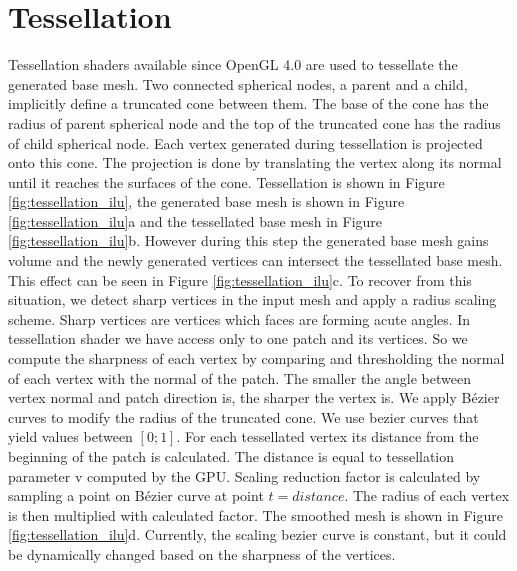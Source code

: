 \section{Tessellation}
Tessellation shaders available since OpenGL 4.0 are used to tessellate the generated base mesh.
Two connected spherical nodes, a parent and a child, implicitly define a truncated cone between them.
The base of the cone has the radius of parent spherical node and the top of the truncated cone has the radius of child spherical node.
Each vertex generated during tessellation is projected onto this cone.
The projection is done by translating the vertex along its normal until it reaches the surfaces of the cone.
Tessellation is shown in Figure \ref{fig:tessellation_ilu}, the generated base mesh is shown in Figure \ref{fig:tessellation_ilu}a and the tessellated base mesh in Figure \ref{fig:tessellation_ilu}b.
However during this step the generated base mesh gains volume and the newly generated vertices can intersect the tessellated base mesh.
This effect can be seen in Figure \ref{fig:tessellation_ilu}c.
To recover from this situation, we detect sharp vertices in the input mesh and apply a radius scaling scheme.
Sharp vertices are vertices which faces are forming acute angles.
In tessellation shader we have access only to one patch and its vertices.
So we compute the sharpness of each vertex by comparing and thresholding the normal of each vertex with the normal of the patch.
The smaller the angle between vertex normal and patch direction is, the sharper the vertex is.
We apply Bézier curves to modify the radius of the truncated cone.
We use bezier curves that yield values between $[0;1]$.
For each tessellated vertex its distance from the beginning of the patch is calculated.
The distance is equal to tessellation parameter v computed by the GPU.
Scaling reduction factor is calculated by sampling a point on Bézier curve at point $t = distance$.
The radius of each vertex is then multiplied with calculated factor.
The smoothed mesh is shown in Figure \ref{fig:tessellation_ilu}d.
Currently, the scaling bezier curve is constant, but it could be dynamically changed based on the sharpness of the vertices.

